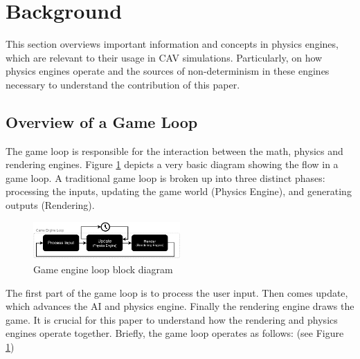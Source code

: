\section{Background}
\noindent This section overviews important information and concepts in physics engines, which are relevant to their usage in CAV simulations. 
Particularly, on how physics engines operate and the sources of non-determinism in these engines necessary to understand the contribution of this paper.
\subsection{Overview of a Game Loop}\label{GameLoopSection}
\noindent The game loop is responsible for the interaction between the math, physics and rendering engines\cite{GameEngineArchBook}.
Figure \ref{GameEngineLoopDiagram} depicts a very basic diagram showing the flow in a game loop. 
A traditional game loop is broken up into three distinct phases: processing the inputs, updating the game world (Physics Engine), and generating outputs (Rendering).
\begin{figure}[h]
\centering
\includegraphics[width=0.5\textwidth]{Other/Figures/GameEngineLoop.pdf}
\caption{Game engine loop block diagram}
\label{GameEngineLoopDiagram}
\end{figure}
The first part of the game loop is to process the user input. Then comes update, which advances the AI and physics engine. Finally the rendering engine draws the game\cite{GameProgPatternsBook}.
It is crucial for this paper to understand how the rendering and physics engines operate together.
Briefly, the game loop operates as follows:\cite{GameProgPatternsBook} (see Figure \ref{GameEngineLoopDiagram})
